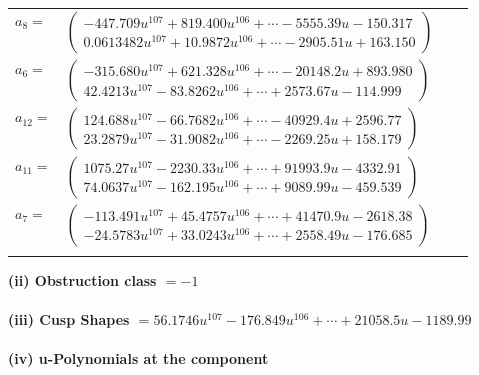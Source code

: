 \documentclass[1p]{elsarticle_modified}
\theoremstyle{definition}
\begin{document}
\begin{tabular}{m{7pt} m{180pt} m{7pt} m{180pt} }
\flushright $a_{8}=$&$\begin{pmatrix}-447.709 u^{107}+819.400 u^{106}+\cdots-5555.39 u-150.317\\0.0613482 u^{107}+10.9872 u^{106}+\cdots-2905.51 u+163.150\end{pmatrix}$ \\
\flushright $a_{6}=$&$\begin{pmatrix}-315.680 u^{107}+621.328 u^{106}+\cdots-20148.2 u+893.980\\42.4213 u^{107}-83.8262 u^{106}+\cdots+2573.67 u-114.999\end{pmatrix}$ \\
\flushright $a_{12}=$&$\begin{pmatrix}124.688 u^{107}-66.7682 u^{106}+\cdots-40929.4 u+2596.77\\23.2879 u^{107}-31.9082 u^{106}+\cdots-2269.25 u+158.179\end{pmatrix}$ \\
\flushright $a_{11}=$&$\begin{pmatrix}1075.27 u^{107}-2230.33 u^{106}+\cdots+91993.9 u-4332.91\\74.0637 u^{107}-162.195 u^{106}+\cdots+9089.99 u-459.539\end{pmatrix}$ \\
\flushright $a_{7}=$&$\begin{pmatrix}-113.491 u^{107}+45.4757 u^{106}+\cdots+41470.9 u-2618.38\\-24.5783 u^{107}+33.0243 u^{106}+\cdots+2558.49 u-176.685\end{pmatrix}$\\&\end{tabular}
\flushleft \textbf{(ii) Obstruction class $= -1$}\\~\\
\flushleft \textbf{(iii) Cusp Shapes $= 56.1746 u^{107}-176.849 u^{106}+\cdots+21058.5 u-1189.99$}\\~\\
\newpage\renewcommand{\arraystretch}{1}
\flushleft \textbf{(iv) u-Polynomials at the component}\newline \\
\end{document}
